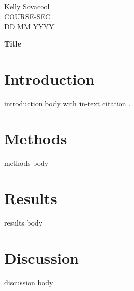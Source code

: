 \documentclass[12pt]{article}
\begin{document}
\begin{flushleft}
Kelly Sovacool\\
COURSE-SEC\\
DD MM YYYY\\
\end{flushleft}

\begin{center}
\LARGE\textbf{Title}
\end{center}

\section*{Introduction}
introduction body with in-text citation \cite{zhou2012}.

\section*{Methods}
methods body

\section*{Results}
results body

\section*{Discussion}
discussion body




\appendix

\end{document}
